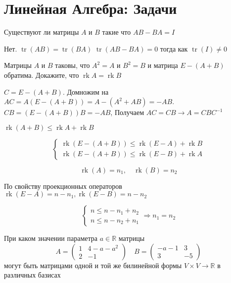 \section{Линейная Алгебра: Задачи}
\begin{problem}
	Существуют ли матрицы $A$ и $ B $ такие что $A B-B A=I$
\end{problem}

\begin{solution}
	Нет. $\operatorname{tr}(A B)=\operatorname{tr}(B A)$  $\operatorname{tr}(A B-B A)=0$ тогда как
	$\operatorname{tr}(I) \neq 0$
\end{solution}

\begin{problem}
 Матрицы $ A $ и $ B $ таковы, что $ A^2 = A $ и $ B^2 = B $ и матрица $ E - (A + B) $ обратима. Докажите, что $ \operatorname{rk} A = \operatorname{rk} B $

\end{problem}
\begin{solution}
	$ C = E - (A+B) $. Домножим на $ A C =  A \left(E - (A+B)\right) = A - (A^2 + AB) = - AB $. $ CB = \left(E - (A+B)\right) B  = - AB $, Получаем $ AC = CB \rightarrow A = CBC^{-1}$
	
\end{solution}	

\begin{solution}
$\operatorname{rk}(A+B) \leqslant \operatorname{rk}A+\operatorname{rk}B$

$$
\left\{\begin{array}{l}{\operatorname{rk} (E-(A+B))} \leqslant \operatorname{rk}(E-A) + \operatorname{rk} B \\ {\operatorname{rk}(E-(A+B))}  \leqslant \operatorname{rk}(E-B) + \operatorname{rk} A \end{array}\right.
$$


$$
\operatorname{rk}(A) = n_1, \quad \operatorname{rk}(B) = n_2
$$

По свойству проекционных операторов 
$
 \operatorname{rk}(E-A) = n - n_1 , \operatorname{rk}(E-B) = n - n_2
$

$$
\left\{\begin{array}{l}
{n\leqslant n - n_1 + n_2}\\{n\leqslant n - n_2 + n_1}
		
\end{array}\right. \Longrightarrow n_1 = n_2
$$		
\end{solution}

\begin{problem}
	При каком значении параметра $ a \in \mathbb{R}  $ матрицы
	$$
	A=\left(\begin{array}{cc}{1} & {4-a-a^{2}} \\ {2} & {-1}\end{array}\right) \quad B=\left(\begin{array}{cc}{-a-1} & {3} \\ {3} & {-5}\end{array}\right)
	$$
	могут быть матрицами одной и той же билинейной формы $
	V \times V \rightarrow \mathbb{R}
	$ в различных базисах
	
\end{problem}

